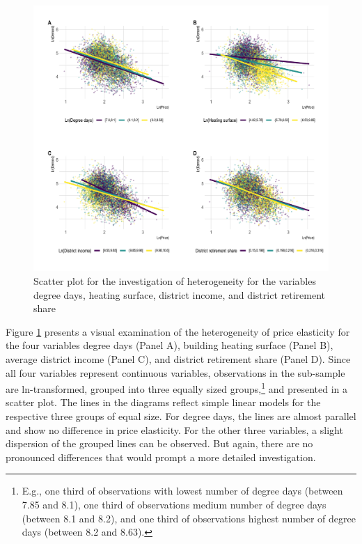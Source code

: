 \documentclass[12pt,twoside]{reedthesis}
\begin{document}
\newpage
\begin{figure}

{\centering \includegraphics[width=0.95\linewidth]{figure/other_variables_heterogeneity_plot} 

}

\caption{Scatter plot for the investigation of heterogeneity for the variables degree days, heating surface, district income, and district retirement share}\label{fig:other-variables-heterogeneity-plot}
\end{figure}
\noindent
Figure \ref{fig:other-variables-heterogeneity-plot} presents a visual examination of the heterogeneity of price elasticity for the four variables degree days (Panel A), building heating surface (Panel B), average district income (Panel C), and district retirement share (Panel D). Since all four variables represent continuous variables, observations in the sub-sample are ln-transformed, grouped into three equally sized groups,\footnote{E.g., one third of observations with lowest number of degree days (between 7.85 and 8.1), one third of observations medium number of degree days (between 8.1 and 8.2), and one third of observations highest number of degree days (between 8.2 and 8.63).} and presented in a scatter plot. The lines in the diagrams reflect simple linear models for the respective three groups of equal size. For degree days, the lines are almost parallel and show no difference in price elasticity. For the other three variables, a slight dispersion of the grouped lines can be observed. But again, there are no pronounced differences that would prompt a more detailed investigation.
\end{document}
